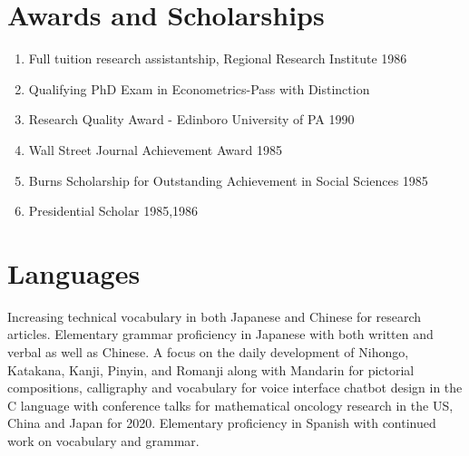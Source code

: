 \documentclass{TMLSStyleGuideResumeVitae}
\begin{document}
\section{Awards and Scholarships}
\begin{enumerate} \itemsep -2pt
\item Full tuition research assistantship, Regional Research Institute 1986  \\
\item Qualifying PhD Exam in Econometrics-Pass with Distinction\\
\item Research Quality Award - Edinboro University of PA 1990\\
\item Wall Street Journal Achievement Award 1985\\
\item Burns Scholarship for Outstanding Achievement in Social Sciences 1985\\
\item Presidential Scholar 1985,1986\\
\end{enumerate}

\section{Languages}
Increasing technical vocabulary in both Japanese and 
Chinese for research articles.
Elementary grammar proficiency in Japanese with both 
written and verbal as well as Chinese.  
A focus on the daily development of Nihongo, Katakana, Kanji, 
Pinyin, and Romanji along with Mandarin for pictorial
compositions, calligraphy and vocabulary for voice 
interface chatbot design in the C language with conference 
talks for mathematical oncology research in the US, China and Japan for 2020.  
Elementary proficiency in Spanish with continued work on vocabulary and grammar.
\begin{enumerate}
\item \href{}{\textcolor{c1}
{Beginner Second Language Acquisition Studies: English - Japanese Edition (初級第二言語習得研究：英語-日本語版)}}}
\end{enumerate}
\end{document}
